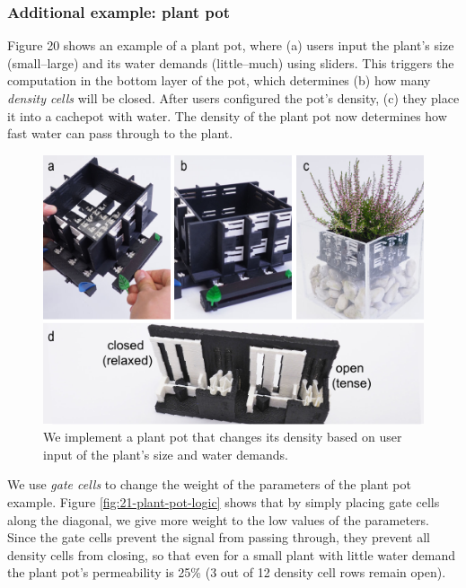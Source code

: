 \subsubsection{Additional example: plant pot}

Figure 20 shows an example of a plant pot, where (a) users input the plant’s size (small--large) and its water demands (little--much) using sliders. This triggers the computation in the bottom layer of the pot, which determines (b) how many \textit{density cells} will be closed. After users configured the pot's density, (c) they place it into a cachepot with water. The density of the plant pot now determines how fast water can pass through to the plant. 

\begin{figure} [h]  
    \includegraphics[width=\textwidth]{chapters/digital-metamaterials-FIG/20-plant-pot-walkthrough-combined.pdf}
    \caption[Short figure name.]{We implement a plant pot that changes its density based on user input of the plant's size and water demands. 
    \label{fig:20-plant-pot-walkthrough-combined}}
\end{figure}

We use \textit{gate cells} to change the weight of the parameters of the plant pot example. Figure \ref{fig:21-plant-pot-logic} shows that by simply placing gate cells along the diagonal, we give more weight to the low values of the parameters. Since the gate cells prevent the signal from passing through, they prevent all density cells from closing, so that even for a small plant with little water demand the plant pot’s permeability is 25\% (3 out of 12 density cell rows remain open).

